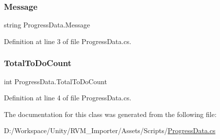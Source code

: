 \subsubsection{\texorpdfstring{Message}{Message}}
{\footnotesize\ttfamily string Progress\+Data.\+Message}



Definition at line 3 of file Progress\+Data.\+cs.

\mbox{\label{class_progress_data_a492f8d3bcace30ba4b1ed320e1ca7823}} 
\subsubsection{\texorpdfstring{TotalToDoCount}{TotalToDoCount}}
{\footnotesize\ttfamily int Progress\+Data.\+Total\+To\+Do\+Count}



Definition at line 4 of file Progress\+Data.\+cs.



The documentation for this class was generated from the following file\+:\begin{DoxyCompactItemize}
\item 
D\+:/\+Workspace/\+Unity/\+R\+V\+M\+\_\+\+Importer/\+Assets/\+Scripts/\mbox{\hyperlink{_progress_data_8cs}{Progress\+Data.\+cs}}\end{DoxyCompactItemize}
